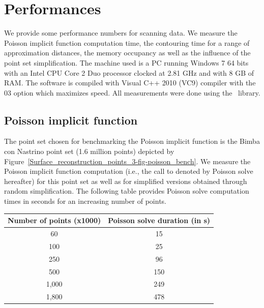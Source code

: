 \section{Performances}
\label{surface_reconstruction_section_performances}

We provide some performance numbers for scanning data. We measure the Poisson implicit function computation time, the contouring time for a range of approximation distances, the memory occupancy as well as the influence of the point set simplification. The machine used is a PC running Windows 7 64 bits with an Intel CPU Core 2 Duo processor clocked at 2.81 GHz and with 8 GB of RAM. The software is compiled with Visual C++ 2010 (VC9) compiler with the 03 option which maximizes speed.  All measurements were done using the \ccThirdPartyEigen\ library.


\subsection{Poisson implicit function}

The point set chosen for benchmarking the Poisson implicit function is the Bimba con Nastrino point set (1.6 million points) depicted by Figure~\ref{Surface_reconstruction_points_3-fig-poisson_bench}. We measure the Poisson implicit function computation (i.e., the call to  denoted by Poisson solve hereafter) for this point set as well as for simplified versions obtained through random simplification. The following table provides Poisson solve computation times in seconds for an increasing number of points.

\begin{tabular}{|c|c|}
  \hline
  Number of points (x1000) & Poisson solve duration (in s) \\
  \hline
  60                         & 15 \\
  100                        & 25 \\
  250                        & 96 \\
  500                        & 150 \\
  1,000                       & 249 \\
  1,800                       & 478 \\
  \hline
\end{tabular}

